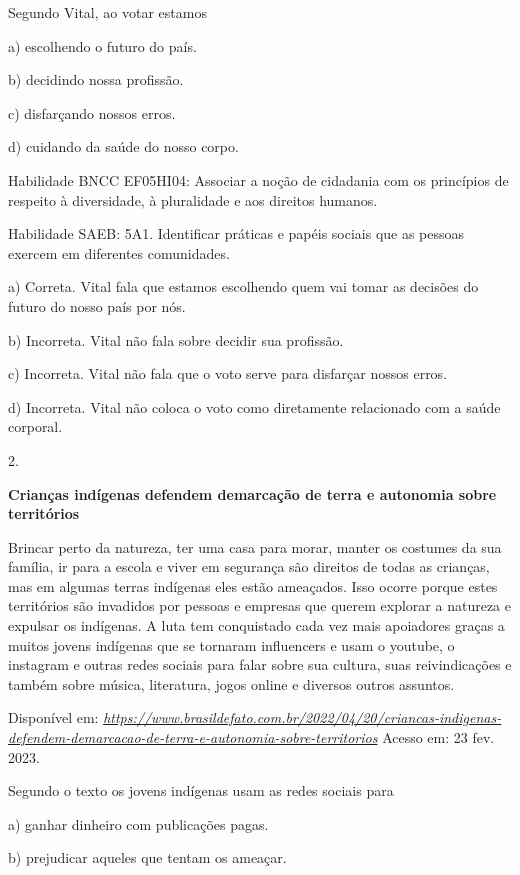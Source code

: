 Segundo Vital, ao votar estamos

a) escolhendo o futuro do país.

b) decidindo nossa profissão.

c) disfarçando nossos erros.

d) cuidando da saúde do nosso corpo.

Habilidade BNCC EF05HI04: Associar a noção de cidadania com os
princípios de respeito à diversidade, à pluralidade e aos direitos
humanos.

Habilidade SAEB: 5A1. Identificar práticas e papéis sociais que as
pessoas exercem em diferentes comunidades.

a) Correta. Vital fala que estamos escolhendo quem vai tomar as decisões
do futuro do nosso país por nós.

b) Incorreta. Vital não fala sobre decidir sua profissão.

c) Incorreta. Vital não fala que o voto serve para disfarçar nossos
erros.

d) Incorreta. Vital não coloca o voto como diretamente relacionado com a
saúde corporal.

2.

\textbf{Crianças indígenas defendem demarcação de terra e autonomia
sobre territórios}

Brincar perto da natureza, ter uma casa para morar, manter os costumes
da sua família, ir para a escola e viver em segurança são direitos de
todas as crianças, mas em algumas terras indígenas eles estão ameaçados.
Isso ocorre porque estes territórios são invadidos por pessoas e
empresas que querem explorar a natureza e expulsar os indígenas. A luta
tem conquistado cada vez mais apoiadores graças a muitos jovens
indígenas que se tornaram influencers e usam o youtube, o instagram e
outras redes sociais para falar sobre sua cultura, suas reivindicações e
também sobre música, literatura, jogos online e diversos outros
assuntos.

Disponível em:
\href{https://www.brasildefato.com.br/2022/04/20/criancas-indigenas-defendem-demarcacao-de-terra-e-autonomia-sobre-territorios}{\emph{https://www.brasildefato.com.br/2022/04/20/criancas-indigenas-defendem-demarcacao-de-terra-e-autonomia-sobre-territorios}}
Acesso em: 23 fev. 2023.

Segundo o texto os jovens indígenas usam as redes sociais para

a) ganhar dinheiro com publicações pagas.

b) prejudicar aqueles que tentam os ameaçar.

